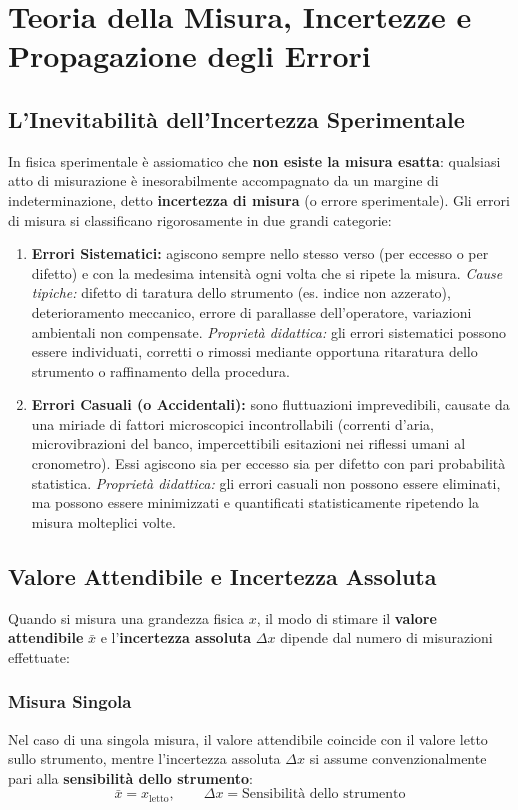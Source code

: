 \documentclass[11pt,a4paper,oneside]{report}
\begin{document}
\chapter{Teoria della Misura, Incertezze e Propagazione degli Errori}

\section{L'Inevitabilità dell'Incertezza Sperimentale}
In fisica sperimentale è assiomatico che \textbf{non esiste la misura esatta}: qualsiasi atto di misurazione è inesorabilmente accompagnato da un margine di indeterminazione, detto \textbf{incertezza di misura} (o errore sperimentale).
Gli errori di misura si classificano rigorosamente in due grandi categorie:

\begin{enumerate}
  \item \textbf{Errori Sistematici:} agiscono sempre nello stesso verso (per eccesso o per difetto) e con la medesima intensità ogni volta che si ripete la misura.
  \textit{Cause tipiche:} difetto di taratura dello strumento (es. indice non azzerato), deterioramento meccanico, errore di parallasse dell'operatore, variazioni ambientali non compensate.
  \textit{Proprietà didattica:} gli errori sistematici possono essere individuati, corretti o rimossi mediante opportuna ritaratura dello strumento o raffinamento della procedura.
  \item \textbf{Errori Casuali (o Accidentali):} sono fluttuazioni imprevedibili, causate da una miriade di fattori microscopici incontrollabili (correnti d'aria, microvibrazioni del banco, impercettibili esitazioni nei riflessi umani al cronometro). Essi agiscono sia per eccesso sia per difetto con pari probabilità statistica.
  \textit{Proprietà didattica:} gli errori casuali non possono essere eliminati, ma possono essere minimizzati e quantificati statisticamente ripetendo la misura molteplici volte.
\end{enumerate}

\section{Valore Attendibile e Incertezza Assoluta}
Quando si misura una grandezza fisica $x$, il modo di stimare il \textbf{valore attendibile} $\bar{x}$ e l'\textbf{incertezza assoluta} $\Delta x$ dipende dal numero di misurazioni effettuate:

\subsection{Misura Singola}
Nel caso di una singola misura, il valore attendibile coincide con il valore letto sullo strumento, mentre l'incertezza assoluta $\Delta x$ si assume convenzionalmente pari alla \textbf{sensibilità dello strumento}:
\[
\bar{x} = x_{\text{letto}}, \qquad \Delta x = \text{Sensibilità dello strumento}
\]
\end{document}
